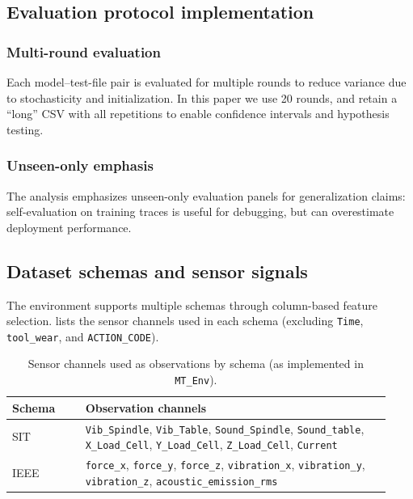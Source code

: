 \documentclass[11pt]{article}
\begin{document}
\subsection{Evaluation protocol implementation}
\label{sec:eval_protocol}
\subsubsection{Multi-round evaluation}
Each model--test-file pair is evaluated for multiple rounds to reduce variance due to stochasticity and initialization. In this paper we use 20 rounds, and retain a ``long'' CSV with all repetitions to enable confidence intervals and hypothesis testing.

\subsubsection{Unseen-only emphasis}
The analysis emphasizes unseen-only evaluation panels for generalization claims: self-evaluation on training traces is useful for debugging, but can overestimate deployment performance.

\subsection{Dataset schemas and sensor signals}
\label{sec:schema}
The environment supports multiple schemas through column-based feature selection.  lists the sensor channels used in each schema (excluding \texttt{Time}, \texttt{tool\_wear}, and \texttt{ACTION\_CODE}).

\begin{table}[t]
\centering
\caption{Sensor channels used as observations by schema (as implemented in \texttt{MT\_Env}).}
\label{tab:schema_features}
\begin{tabular}{p{0.18\linewidth} p{0.75\linewidth}}
\toprule
\rowcolor{gray!20} \textbf{Schema} & \textbf{Observation channels}\\
\midrule
SIT & \texttt{Vib\_Spindle}, \texttt{Vib\_Table}, \texttt{Sound\_Spindle}, \texttt{Sound\_table}, \texttt{X\_Load\_Cell}, \texttt{Y\_Load\_Cell}, \texttt{Z\_Load\_Cell}, \texttt{Current}\\
IEEE & \texttt{force\_x}, \texttt{force\_y}, \texttt{force\_z}, \texttt{vibration\_x}, \texttt{vibration\_y}, \texttt{vibration\_z}, \texttt{acoustic\_emission\_rms}\\
\bottomrule
\end{tabular}
\end{table}
\end{document}
